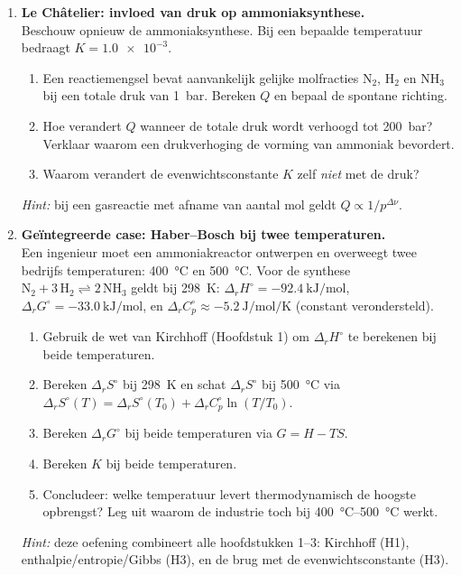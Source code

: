 \begin{enumerate}
\item \textbf{Le Ch\^atelier: invloed van druk op ammoniaksynthese.} \\
Beschouw opnieuw de ammoniaksynthese. Bij een bepaalde temperatuur bedraagt $K = \num{1.0e-3}$.
\begin{enumerate}
\item[(a)] Een reactiemengsel bevat aanvankelijk gelijke molfracties $\mathrm{N_2}$, $\mathrm{H_2}$ en $\mathrm{NH_3}$ bij een totale druk van \SI{1}{\bar}. Bereken $Q$ en bepaal de spontane richting.
\item[(b)] Hoe verandert $Q$ wanneer de totale druk wordt verhoogd tot \SI{200}{\bar}? Verklaar waarom een drukverhoging de vorming van ammoniak bevordert.
\item[(c)] Waarom verandert de evenwichtsconstante $K$ zelf \emph{niet} met de druk?
\end{enumerate}
\emph{Hint:} bij een gasreactie met afname van aantal mol geldt $Q \propto 1/p^{\Delta \nu}$.

\item \textbf{Geïntegreerde case: Haber--Bosch bij twee temperaturen.} \\
Een ingenieur moet een ammoniakreactor ontwerpen en overweegt twee bedrijfs temperaturen: \SI{400}{\celsius} en \SI{500}{\celsius}. Voor de synthese $\mathrm{N_2 + 3\,H_2 \rightleftharpoons 2\,NH_3}$ geldt bij \SI{298}{\kelvin}: $\Delta_r H^\circ = \SI{-92.4}{\kilo\joule\per\mole}$, $\Delta_r G^\circ = \SI{-33.0}{\kilo\joule\per\mole}$, en $\Delta_r C_p^\circ \approx \SI{-5.2}{\joule\per\mole\per\kelvin}$ (constant verondersteld).
\begin{enumerate}
\item[(a)] Gebruik de wet van Kirchhoff (Hoofdstuk 1) om $\Delta_r H^\circ$ te berekenen bij beide temperaturen.
\item[(b)] Bereken $\Delta_r S^\circ$ bij \SI{298}{\kelvin} en schat $\Delta_r S^\circ$ bij \SI{500}{\celsius} via $\Delta_r S^\circ(T) = \Delta_r S^\circ(T_0) + \Delta_r C_p^\circ \ln(T/T_0)$.
\item[(c)] Bereken $\Delta_r G^\circ$ bij beide temperaturen via $G = H - TS$.
\item[(d)] Bereken $K$ bij beide temperaturen.
\item[(e)] Concludeer: welke temperatuur levert thermodynamisch de hoogste opbrengst? Leg uit waarom de industrie toch bij \SIrange{400}{500}{\celsius} werkt.
\end{enumerate}
\emph{Hint:} deze oefening combineert alle hoofdstukken 1--3: Kirchhoff (H1), enthalpie/entropie/Gibbs (H3), en de brug met de evenwichtsconstante (H3).

\end{enumerate}


